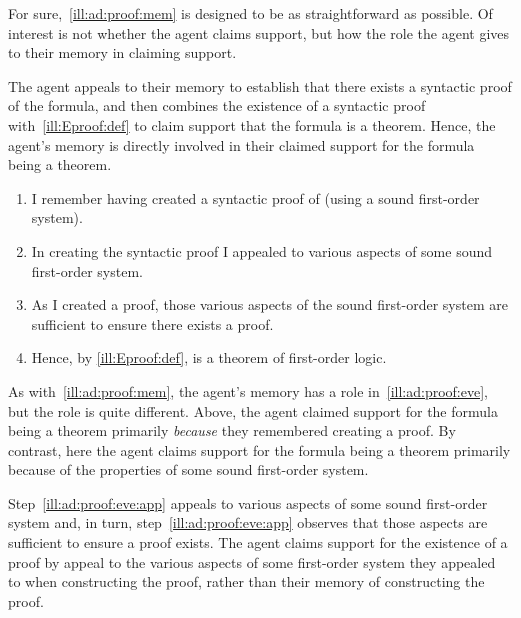 \begin{note}[Memory]
  For sure,~\autoref{ill:ad:proof:mem} is designed to be as straightforward as possible.
  Of interest is not whether the agent claims support, but how the role the agent gives to their memory in claiming support.

  The agent appeals to their memory to establish that there exists a syntactic proof of the formula, and then combines the existence of a syntactic proof with~\ref{ill:Eproof:def} to claim support that the formula is a theorem.
  Hence, the agent's memory is directly involved in their claimed support for the formula being a theorem.
\end{note}


\begin{note}
  \begin{illustration}\label{ill:ad:proof:eve}
    \begin{enumerate}
    \item I remember having created a syntactic proof of  (using a sound first-order system).
    \item\label{ill:ad:proof:eve:app} In creating the syntactic proof I appealed to various aspects of some sound first-order system.
    \item\label{ill:ad:proof:eve:pos} As I created a proof, those various aspects of the sound first-order system are sufficient to ensure there exists a proof.
    \item Hence, by \ref{ill:Eproof:def},  is a theorem of first-order logic.
    \end{enumerate}
  \end{illustration}

  As with~\autoref{ill:ad:proof:mem}, the agent's memory has a role in~\autoref{ill:ad:proof:eve}, but the role is quite different.
  Above, the agent claimed support for the formula being a theorem primarily \emph{because} they remembered creating a proof.
  By contrast, here the agent claims support for the formula being a theorem primarily because of the properties of some sound first-order system.

  Step~\ref{ill:ad:proof:eve:app} appeals to various aspects of some sound first-order system and, in turn, step~\ref{ill:ad:proof:eve:app} observes that those aspects are sufficient to ensure a proof exists.
  The agent claims support for the existence of a proof by appeal to the various aspects of some first-order system they appealed to when constructing the proof, rather than their memory of constructing the proof.
\end{note}


